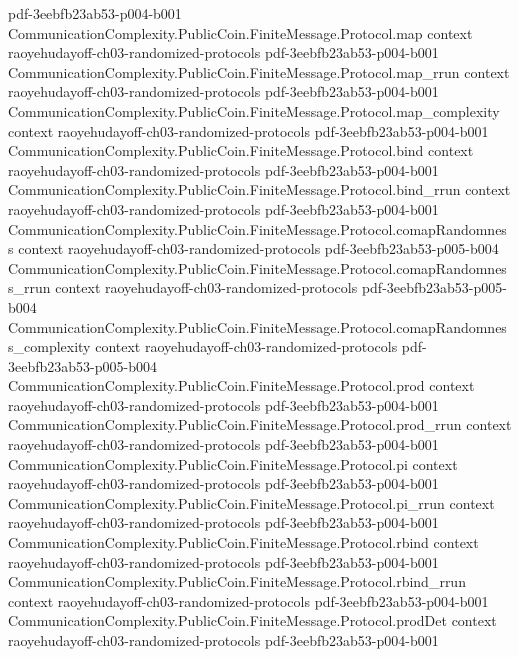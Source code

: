 \begin{theorem}
  {pdf-3eebfb23ab53-p004-b001}
\proofstep
  {CommunicationComplexity.PublicCoin.FiniteMessage.Protocol.map}
  {context}
  {raoyehudayoff-ch03-randomized-protocols}
  {pdf-3eebfb23ab53-p004-b001}
\proofstep
  {CommunicationComplexity.PublicCoin.FiniteMessage.Protocol.map_rrun}
  {context}
  {raoyehudayoff-ch03-randomized-protocols}
  {pdf-3eebfb23ab53-p004-b001}
\proofstep
  {CommunicationComplexity.PublicCoin.FiniteMessage.Protocol.map_complexity}
  {context}
  {raoyehudayoff-ch03-randomized-protocols}
  {pdf-3eebfb23ab53-p004-b001}
\proofstep
  {CommunicationComplexity.PublicCoin.FiniteMessage.Protocol.bind}
  {context}
  {raoyehudayoff-ch03-randomized-protocols}
  {pdf-3eebfb23ab53-p004-b001}
\proofstep
  {CommunicationComplexity.PublicCoin.FiniteMessage.Protocol.bind_rrun}
  {context}
  {raoyehudayoff-ch03-randomized-protocols}
  {pdf-3eebfb23ab53-p004-b001}
\proofstep
  {CommunicationComplexity.PublicCoin.FiniteMessage.Protocol.comapRandomness}
  {context}
  {raoyehudayoff-ch03-randomized-protocols}
  {pdf-3eebfb23ab53-p005-b004}
\proofstep
  {CommunicationComplexity.PublicCoin.FiniteMessage.Protocol.comapRandomness_rrun}
  {context}
  {raoyehudayoff-ch03-randomized-protocols}
  {pdf-3eebfb23ab53-p005-b004}
\proofstep
  {CommunicationComplexity.PublicCoin.FiniteMessage.Protocol.comapRandomness_complexity}
  {context}
  {raoyehudayoff-ch03-randomized-protocols}
  {pdf-3eebfb23ab53-p005-b004}
\proofstep
  {CommunicationComplexity.PublicCoin.FiniteMessage.Protocol.prod}
  {context}
  {raoyehudayoff-ch03-randomized-protocols}
  {pdf-3eebfb23ab53-p004-b001}
\proofstep
  {CommunicationComplexity.PublicCoin.FiniteMessage.Protocol.prod_rrun}
  {context}
  {raoyehudayoff-ch03-randomized-protocols}
  {pdf-3eebfb23ab53-p004-b001}
\proofstep
  {CommunicationComplexity.PublicCoin.FiniteMessage.Protocol.pi}
  {context}
  {raoyehudayoff-ch03-randomized-protocols}
  {pdf-3eebfb23ab53-p004-b001}
\proofstep
  {CommunicationComplexity.PublicCoin.FiniteMessage.Protocol.pi_rrun}
  {context}
  {raoyehudayoff-ch03-randomized-protocols}
  {pdf-3eebfb23ab53-p004-b001}
\proofstep
  {CommunicationComplexity.PublicCoin.FiniteMessage.Protocol.rbind}
  {context}
  {raoyehudayoff-ch03-randomized-protocols}
  {pdf-3eebfb23ab53-p004-b001}
\proofstep
  {CommunicationComplexity.PublicCoin.FiniteMessage.Protocol.rbind_rrun}
  {context}
  {raoyehudayoff-ch03-randomized-protocols}
  {pdf-3eebfb23ab53-p004-b001}
\proofstep
  {CommunicationComplexity.PublicCoin.FiniteMessage.Protocol.prodDet}
  {context}
  {raoyehudayoff-ch03-randomized-protocols}
  {pdf-3eebfb23ab53-p004-b001}
\proofstep

\end{theorem}
